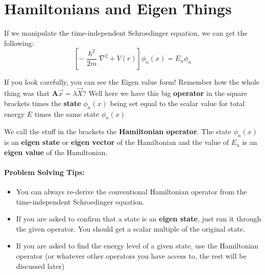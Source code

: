 \documentclass[a4paper,12pt]{report}
\begin{document}
\section{Hamiltonians and Eigen Things}

If we manipulate the time-independent Schroedinger equation, we can get the following: $$[-\frac{\hslash^2}{2m} \nabla^2 + V(r)]\phi_n(x) = E_n\phi_n$$

If you look carefully, you can see the Eigen value form! Remember how the whole thing was that $\pmb{A}\vec{x} = \lambda \vec{X}$? Well here we have this big 
\textbf{operator} in the square brackets times the \textbf{state} $\phi_n(x)$ being set equal to the scalar value for total energy $E$ times the same state $\phi_n(x)$

We call the stuff in the brackets the \textbf{Hamiltonian operator}. The state $\phi_n(x)$ is an \textbf{eigen state} or \textbf{eigen vector} of the Hamiltonian and the value of $E_n$ is an \textbf{eigen value} of the Hamiltonian. 

\paragraph{Problem Solving Tips: }
\begin{itemize}
\item You can always re-derive the conventional Hamiltonian operator from the time-independent Schroedinger equation.
\item If you are asked to confirm that a state is an \textbf{eigen state}, just run it through the given operator. You should get a scalar multiple of the original state.
\item If you are asked to find the energy level of a given state, use the Hamiltonian operator (or whatever other operators you have access to, the rest will be discussed later) 
\end{itemize}
\end{document}

